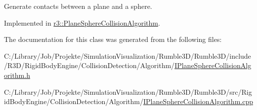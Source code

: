 Generate contacts between a plane and a sphere. 



Implemented in \mbox{\hyperlink{classr3_1_1_plane_sphere_collision_algorithm_a6823dc80b23ce77beabd26a9c2a9d9ed}{r3\+::\+Plane\+Sphere\+Collision\+Algorithm}}.



The documentation for this class was generated from the following files\+:\begin{DoxyCompactItemize}
\item 
C\+:/\+Library/\+Job/\+Projekte/\+Simulation\+Visualization/\+Rumble3\+D/\+Rumble3\+D/include/\+R3\+D/\+Rigid\+Body\+Engine/\+Collision\+Detection/\+Algorithm/\mbox{\hyperlink{_i_plane_sphere_collision_algorithm_8h}{I\+Plane\+Sphere\+Collision\+Algorithm.\+h}}\item 
C\+:/\+Library/\+Job/\+Projekte/\+Simulation\+Visualization/\+Rumble3\+D/\+Rumble3\+D/src/\+Rigid\+Body\+Engine/\+Collision\+Detection/\+Algorithm/\mbox{\hyperlink{_i_plane_sphere_collision_algorithm_8cpp}{I\+Plane\+Sphere\+Collision\+Algorithm.\+cpp}}\end{DoxyCompactItemize}
